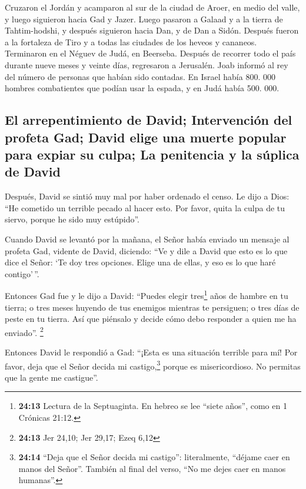  Cruzaron el Jordán y acamparon al sur de la ciudad de
Aroer, en medio del valle, y luego siguieron hacia Gad y Jazer.
 Luego pasaron a Galaad y a la tierra de Tahtim-hodshi, y
después siguieron hacia Dan, y de Dan a Sidón.  Después
fueron a la fortaleza de Tiro y a todas las ciudades de los heveos y
cananeos. Terminaron en el Néguev de Judá, en Beerseba. 
Después de recorrer todo el país durante nueve meses y veinte días,
regresaron a Jerusalén.  Joab informó al rey del número de
personas que habían sido contadas. En Israel había 800. 000 hombres
combatientes que podían usar la espada, y en Judá había 500. 000.

\hypertarget{el-arrepentimiento-de-david-intervenciuxf3n-del-profeta-gad-david-elige-una-muerte-popular-para-expiar-su-culpa-la-penitencia-y-la-suxfaplica-de-david}{%
\subsection{El arrepentimiento de David; Intervención del profeta Gad;
David elige una muerte popular para expiar su culpa; La penitencia y la
súplica de
David}\label{el-arrepentimiento-de-david-intervenciuxf3n-del-profeta-gad-david-elige-una-muerte-popular-para-expiar-su-culpa-la-penitencia-y-la-suxfaplica-de-david}}

 Después, David se sintió muy mal por haber ordenado el
censo. Le dijo a Dios: ``He cometido un terrible pecado al hacer esto.
Por favor, quita la culpa de tu siervo, porque he sido muy estúpido''.

 Cuando David se levantó por la mañana, el Señor había
enviado un mensaje al profeta Gad, vidente de David, diciendo:
 ``Ve y dile a David que esto es lo que dice el Señor:
`Te doy tres opciones. Elige una de ellas, y eso es lo que haré
contigo'\,''.

 Entonces Gad fue y le dijo a David: ``Puedes elegir
tres\footnote{\textbf{24:13} Lectura de la Septuaginta. En hebreo se lee
  ``siete años'', como en 1 Crónicas 21:12.} años de hambre en tu
tierra; o tres meses huyendo de tus enemigos mientras te persiguen; o
tres días de peste en tu tierra. Así que piénsalo y decide cómo debo
responder a quien me ha enviado''. \footnote{\textbf{24:13} Jer 24,10;
  Jer 29,17; Ezeq 6,12}

 Entonces David le respondió a Gad: ``¡Esta es una
situación terrible para mí! Por favor, deja que el Señor decida mi
castigo,\footnote{\textbf{24:14} ``Deja que el Señor decida mi
  castigo'': literalmente, ``déjame caer en manos del Señor''. También
  al final del verso, ``No me dejes caer en manos humanas''.} porque es
misericordioso. No permitas que la gente me castigue''.


